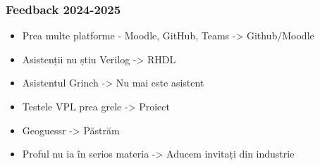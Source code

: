 \begin{frame}
    \frametitle{Feedback 2024-2025}
    
    \begin{itemize}
        \item Prea multe platforme - Moodle, GitHub, Teams -> Github/Moodle
        \item Asistenții nu știu Verilog -> RHDL
        \item Asistentul Grinch -> Nu mai este asistent
        \item Testele VPL prea grele -> Proiect
        \item Geoguessr -> Păstrăm
        \item Proful nu ia în serios materia -> Aducem invitați din industrie
    \end{itemize}
\end{frame}